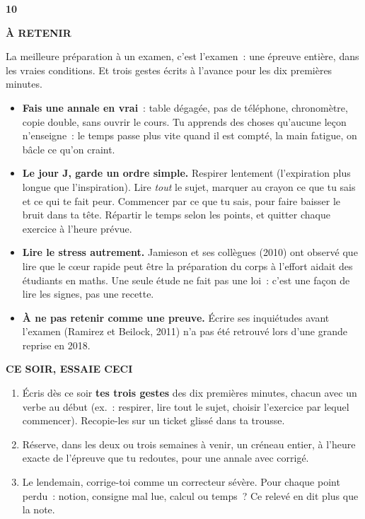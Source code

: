 \documentclass[10pt,twoside,openany]{book}
\newenvironment{aretenir}[1][À retenir]{\par\begin{tcolorbox}[enhanced,colback=creme,colframe=accent,boxrule=0pt,leftrule=3pt,arc=0pt,left=8pt,right=8pt,top=5pt,bottom=5pt,breakable]{\small\bfseries\color{accent}\MakeUppercase{#1}}\par\smallskip}{\end{tcolorbox}\par}
\newenvironment{cesoir}[1][Ce soir, essaie ceci]{\par\begin{tcolorbox}[enhanced,colback=white,colframe=vert,boxrule=0.6pt,arc=2pt,left=8pt,right=8pt,top=5pt,bottom=5pt,breakable]{\small\bfseries\color{vert}\MakeUppercase{#1}}\par\smallskip\small}{\end{tcolorbox}\par}
\newcommand{\fiche}[3]{\clearpage\markright{#2}\thispagestyle{plain}%
 {\noindent\color{accent}\fontsize{40}{40}\selectfont\bfseries #1}\hspace{0.6em}{\Large\bfseries #2\par}\vspace{0.1em}{\small\color{gris}\itshape #3\par}\vspace{0.5em}}
\begin{document}
\fiche{10}{La copie double}{Chapitre 10 du livre}
\begin{aretenir}
La meilleure préparation à un examen, c’est l’examen : une épreuve entière, dans les vraies conditions. Et trois gestes écrits à l’avance pour les dix premières minutes.
\end{aretenir}
\begin{itemize}
\item \textbf{Fais une annale en vrai} : table dégagée, pas de téléphone, chronomètre, copie double, sans ouvrir le cours. Tu apprends des choses qu’aucune leçon n’enseigne : le temps passe plus vite quand il est compté, la main fatigue, on bâcle ce qu’on craint.
\item \textbf{Le jour J, garde un ordre simple.} Respirer lentement (l’expiration plus longue que l’inspiration). Lire \emph{tout} le sujet, marquer au crayon ce que tu sais et ce qui te fait peur. Commencer par ce que tu sais, pour faire baisser le bruit dans ta tête. Répartir le temps selon les points, et quitter chaque exercice à l’heure prévue.
\item \textbf{Lire le stress autrement.} Jamieson et ses collègues (2010) ont observé que lire que le cœur rapide peut être la préparation du corps à l’effort aidait des étudiants en maths. Une seule étude ne fait pas une loi : c’est une façon de lire les signes, pas une recette.
\item \textbf{À ne pas retenir comme une preuve.} Écrire ses inquiétudes avant l’examen (Ramirez et Beilock, 2011) n’a pas été retrouvé lors d’une grande reprise en 2018.
\end{itemize}
\begin{cesoir}
\begin{enumerate}
\item Écris dès ce soir \textbf{tes trois gestes} des dix premières minutes, chacun avec un verbe au début (ex. : respirer, lire tout le sujet, choisir l’exercice par lequel commencer). Recopie-les sur un ticket glissé dans ta trousse.
\item Réserve, dans les deux ou trois semaines à venir, un créneau entier, à l’heure exacte de l’épreuve que tu redoutes, pour une annale avec corrigé.
\item Le lendemain, corrige-toi comme un correcteur sévère. Pour chaque point perdu : notion, consigne mal lue, calcul ou temps ? Ce relevé en dit plus que la note.
\end{enumerate}
\end{cesoir}
\end{document}

